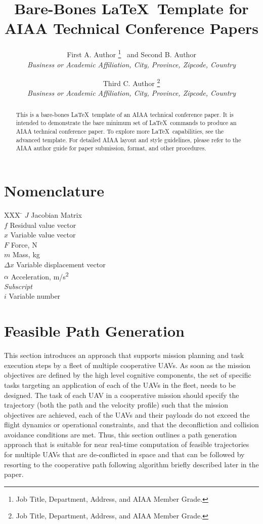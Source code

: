 \documentclass[]{aiaa-tc}%
\title{Bare-Bones \LaTeX\ Template for\\
        AIAA Technical Conference Papers}
\author{
  First A. Author%
    \thanks{Job Title, Department, Address, and AIAA Member Grade.}
  \ and Second B. Author\thanksibid{1}\\
  {\normalsize\itshape
   Business or Academic Affiliation, City, Province, Zipcode, Country}\\
  \and
  Third C. Author%
   \thanks{Job Title, Department, Address, and AIAA Member Grade.}\\
  {\normalsize\itshape
  Business or Academic Affiliation, City, Province, Zipcode, Country}
 }
\begin{document}
\maketitle

\begin{abstract}
This is a bare-bones \LaTeX\ template of an AIAA technical conference
paper. It is intended to demonstrate the bare minimum set of \LaTeX\
commands to produce an AIAA technical conference paper. To explore more
\LaTeX\ capabilities, see the advanced template. For detailed AIAA layout
and style guidelines, please refer to the AIAA author guide for paper
submission, format, and other procedures.
\end{abstract}

\section*{Nomenclature}

\begin{tabbing}
  XXX \= \kill%
  $J$ \> Jacobian Matrix \\
  $f$ \> Residual value vector \\
  $x$ \> Variable value vector \\
  $F$ \> Force, N \\
  $m$ \> Mass, kg \\
  $\Delta x$ \> Variable displacement vector \\
  $\alpha$ \> Acceleration, m/s\textsuperscript{2} \\[5pt]
  \textit{Subscript}\\
  $i$ \> Variable number \\
 \end{tabbing}


\section{Feasible Path Generation}
This section introduces an approach that supports mission planning and task
execution steps by a fleet of multiple cooperative UAVs. As soon as the
mission objectives are defined by the high level cognitive components, the
set of specific tasks targeting an application of each of the UAVs in the
fleet, needs to be designed. The task of each UAV in a cooperative mission
should specify the trajectory (both the path and the velocity profile) such
that the mission objectives are achieved, each of the UAVs and their
payloads do not exceed the flight dynamics or operational constraints, and
that the deconfliction and collision avoidance conditions are met.
Thus, this section outlines a path generation approach that is suitable for
near real-time computation of feasible trajectories for multiple UAVs that
are de-conflicted in space and that can be followed by resorting to the
cooperative path following algorithm briefly described later in the paper.
\end{document}
